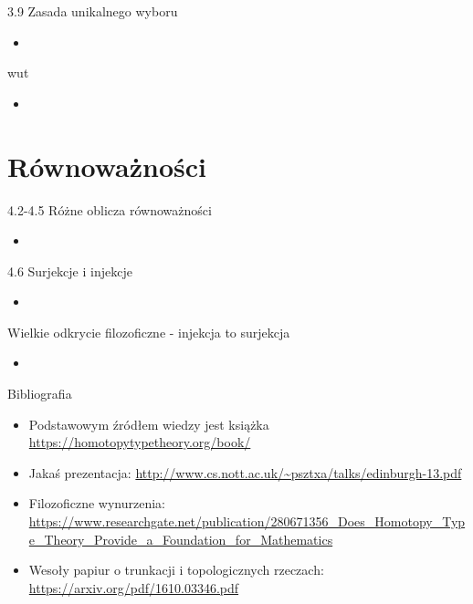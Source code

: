 \documentclass{beamer}
\begin{document}
\begin{frame}{3.9 Zasada unikalnego wyboru}
\begin{itemize}
	\item
\end{itemize}
\end{frame}

\begin{frame}{wut}
\begin{itemize}
	\item
\end{itemize}
\end{frame}

\section{Równoważności}

\begin{frame}{4.2-4.5 Różne oblicza równoważności}
\begin{itemize}
	\item
\end{itemize}
\end{frame}

\begin{frame}{4.6 Surjekcje i injekcje}
\begin{itemize}
	\item
\end{itemize}
\end{frame}

\begin{frame}{Wielkie odkrycie filozoficzne - injekcja to surjekcja}
\begin{itemize}
	\item
\end{itemize}
\end{frame}

\begin{frame}{Bibliografia}
\begin{itemize}
	\item Podstawowym źródłem wiedzy jest książka \url{https://homotopytypetheory.org/book/}
	\item Jakaś prezentacja: \url{http://www.cs.nott.ac.uk/~psztxa/talks/edinburgh-13.pdf}
	\item Filozoficzne wynurzenia: \url{https://www.researchgate.net/publication/280671356_Does_Homotopy_Type_Theory_Provide_a_Foundation_for_Mathematics}
	\item Wesoły papiur o trunkacji i topologicznych rzeczach: \url{https://arxiv.org/pdf/1610.03346.pdf}
\end{itemize}
\end{frame}
\end{document}
